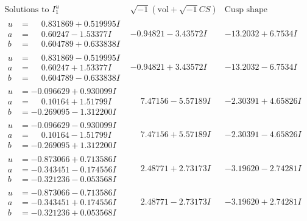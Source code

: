 \documentclass[1p]{elsarticle_modified}
\theoremstyle{definition}
\newcommand{\I}{\sqrt{-1}}
\begin{document}
$$\begin{array}{c|c|c}  
\text{Solutions to }I^u_{1}& \I (\text{vol} + \sqrt{-1}CS) & \text{Cusp shape}\\
 \hline 
\begin{aligned}
u &= \phantom{-}0.831869 + 0.519995 I \\
a &= \phantom{-}0.60247 - 1.53377 I \\
b &= \phantom{-}0.604789 + 0.633838 I\end{aligned}
 & -0.94821 - 3.43572 I & -13.2032 + 6.7534 I \\ \hline\begin{aligned}
u &= \phantom{-}0.831869 - 0.519995 I \\
a &= \phantom{-}0.60247 + 1.53377 I \\
b &= \phantom{-}0.604789 - 0.633838 I\end{aligned}
 & -0.94821 + 3.43572 I & -13.2032 - 6.7534 I \\ \hline\begin{aligned}
u &= -0.096629 + 0.930099 I \\
a &= \phantom{-}0.10164 + 1.51799 I \\
b &= -0.269095 - 1.312200 I\end{aligned}
 & \phantom{-}7.47156 - 5.57189 I & -2.30391 + 4.65826 I \\ \hline\begin{aligned}
u &= -0.096629 - 0.930099 I \\
a &= \phantom{-}0.10164 - 1.51799 I \\
b &= -0.269095 + 1.312200 I\end{aligned}
 & \phantom{-}7.47156 + 5.57189 I & -2.30391 - 4.65826 I \\ \hline\begin{aligned}
u &= -0.873066 + 0.713586 I \\
a &= -0.343451 - 0.174556 I \\
b &= -0.321236 - 0.053568 I\end{aligned}
 & \phantom{-}2.48771 + 2.73173 I & -3.19620 - 2.74281 I \\ \hline\begin{aligned}
u &= -0.873066 - 0.713586 I \\
a &= -0.343451 + 0.174556 I \\
b &= -0.321236 + 0.053568 I\end{aligned}
 & \phantom{-}2.48771 - 2.73173 I & -3.19620 + 2.74281 I \\ \hline\begin{aligned}

\end{aligned}
\end{array}$$
\end{document}
